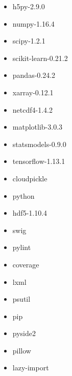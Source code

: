 \begin{itemize}
  \item h5py-2.9.0
  \item numpy-1.16.4
  \item scipy-1.2.1
  \item scikit-learn-0.21.2
  \item pandas-0.24.2
  \item xarray-0.12.1
  \item netcdf4-1.4.2
  \item matplotlib-3.0.3
  \item statsmodels-0.9.0
  \item tensorflow-1.13.1
  \item cloudpickle
  \item python
  \item hdf5-1.10.4
  \item swig
  \item pylint
  \item coverage
  \item lxml
  \item psutil
  \item pip
  \item pyside2
  \item pillow
  \item lazy-import
\end{itemize}
